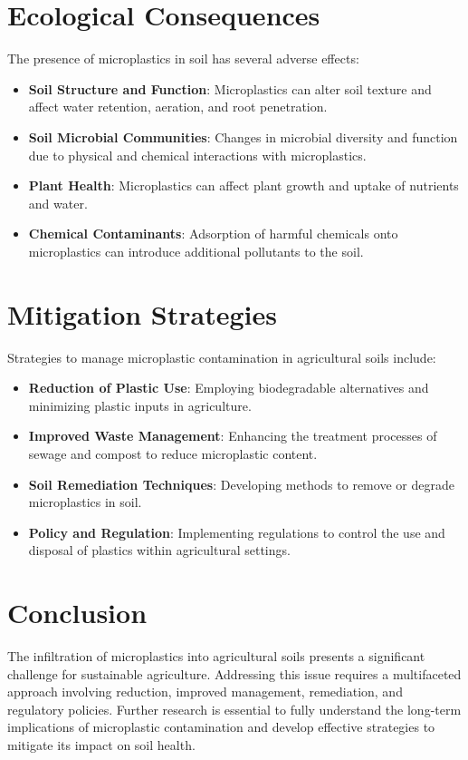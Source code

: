 \documentclass[12pt]{article}
\begin{document}
\section{Ecological Consequences}

The presence of microplastics in soil has several adverse effects:
\begin{itemize}
    \item \textbf{Soil Structure and Function}: Microplastics can alter soil texture and affect water retention, aeration, and root penetration.
    \item \textbf{Soil Microbial Communities}: Changes in microbial diversity and function due to physical and chemical interactions with microplastics.
    \item \textbf{Plant Health}: Microplastics can affect plant growth and uptake of nutrients and water.
    \item \textbf{Chemical Contaminants}: Adsorption of harmful chemicals onto microplastics can introduce additional pollutants to the soil.
\end{itemize}

\section{Mitigation Strategies}

Strategies to manage microplastic contamination in agricultural soils include:
\begin{itemize}
    \item \textbf{Reduction of Plastic Use}: Employing biodegradable alternatives and minimizing plastic inputs in agriculture.
    \item \textbf{Improved Waste Management}: Enhancing the treatment processes of sewage and compost to reduce microplastic content.
    \item \textbf{Soil Remediation Techniques}: Developing methods to remove or degrade microplastics in soil.
    \item \textbf{Policy and Regulation}: Implementing regulations to control the use and disposal of plastics within agricultural settings.
\end{itemize}

\section{Conclusion}

The infiltration of microplastics into agricultural soils presents a significant challenge for sustainable agriculture. Addressing this issue requires a multifaceted approach involving reduction, improved management, remediation, and regulatory policies. Further research is essential to fully understand the long-term implications of microplastic contamination and develop effective strategies to mitigate its impact on soil health.



\end{document}

